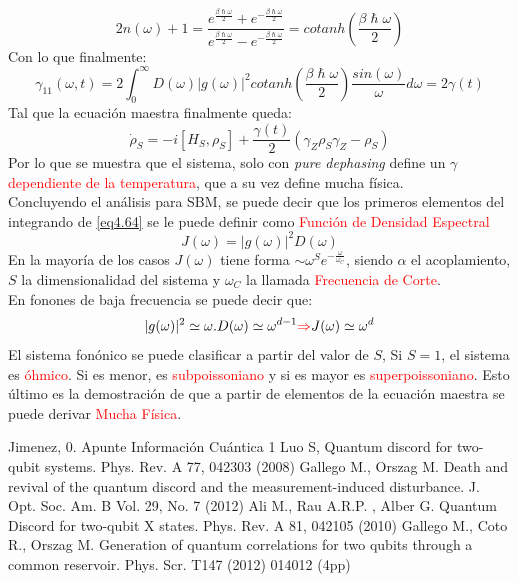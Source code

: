 \documentclass{book}
\begin{document}
\begin{equation}\label{eq4.63}2n(\omega)+1=\frac{e^{\frac{\beta\hslash\omega}{2}}+e^{-\frac{\beta\hslash\omega}{2}}}{e^{\frac{\beta\hslash\omega}{2}}-e^{-\frac{\beta\hslash\omega}{2}}}=cotanh(\frac{\beta\hslash\omega}{2})\end{equation}
Con lo que finalmente:
\begin{equation}\label{eq4.64}\gamma_{11}(\omega,t)=2\int_0^\infty D(\omega)\lvert g(\omega)\rvert^2cotanh(\frac{\beta\hslash\omega}{2})\frac{sin(\omega)}{\omega} d\omega=2\gamma(t)\end{equation}
Tal que la ecuación maestra finalmente queda:
\begin{equation}\label{eq4.65}\dot{\rho}_S=-i[H_S,\rho_S]+\frac{\gamma(t)}{2}(\gamma_Z\rho_S\gamma_Z-\rho_S)\end{equation}
Por lo que se muestra que el sistema, solo con \textit{pure dephasing} define un $\gamma$ \textcolor{red}{dependiente de la temperatura}, que a su vez define mucha física.\\

Concluyendo el análisis para SBM, se puede decir que los primeros elementos del integrando de \ref{eq4.64} se le puede definir como \textcolor{red}{Función de Densidad Espectral}
\begin{equation}\label{eq4.66}J(\omega)=\lvert g(\omega)\rvert^2 D(\omega)\end{equation}
En la mayoría de los casos $J(\omega)$ tiene forma $\sim \omega^S e^{-\frac{\omega}{\omega_C}}$, siendo $\alpha$ el acoplamiento, $S$ la dimensionalidad del sistema y $\omega_C$ la llamada \textcolor{red}{Frecuencia de Corte}. \\

En fonones de baja frecuencia se puede decir que:
\begin{equation}\label{eq4.67}\lvert g(\omega)\rvert^2\simeq\omega. D(\omega)\simeq \omega^{d-1} \textcolor{red}{\Rightarrow} J(\omega)\simeq\omega^d \end{equation}
El sistema fonónico se puede clasificar a partir del valor de $S$, Si $S=1$, el sistema es \textcolor{red}{óhmico}. Si es menor, es \textcolor{red}{subpoissoniano} y si es mayor es \textcolor{red}{superpoissoniano}. Esto último es la demostración de que a partir de elementos de la ecuación maestra se puede derivar \textcolor{red}{Mucha Física}.
\begin{thebibliography}{XXX0000}
   Jimenez, 0. Apunte Información Cuántica 1
     Luo S, Quantum discord for two-qubit systems. Phys. Rev. A 77, 042303 (2008)
   Gallego M., Orszag M. Death and revival of the quantum discord and the
measurement-induced disturbance. J. Opt. Soc. Am. B Vol. 29, No. 7 (2012)
 Ali M., Rau A.R.P. , Alber G. Quantum Discord for two-qubit X states. Phys. Rev. A 81, 042105 (2010)
   Gallego M., Coto R., Orszag M. Generation of quantum correlations for
two qubits through a common reservoir. Phys. Scr. T147 (2012) 014012 (4pp)
\end{thebibliography}
\end{document}
